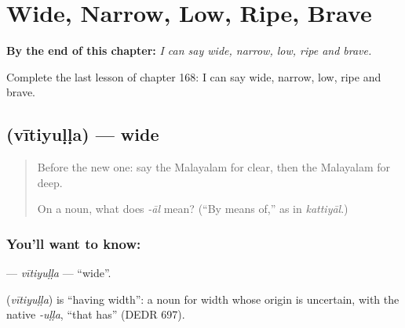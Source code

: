 
\chapter{Wide, Narrow, Low, Ripe, Brave}
\label{ch:ml-wide-narrow-low-ripe-brave}

\begin{chapteropening}
\textbf{By the end of this chapter:} \emph{I can say wide, narrow, low, ripe and brave.}

Complete the last lesson of chapter 168: I can say wide, narrow, low, ripe and brave.
\end{chapteropening}

\section[\texorpdfstring{\ml{വീതിയുള്ള} (vītiyuḷḷa)}{വീതിയുള്ള (vītiyuḷḷa)}]{ (vītiyuḷḷa) — wide}

\label{lesson:ML-C168-vitiyulla}



\begin{quote}
Before the new one: say the Malayalam for clear, then the Malayalam for deep.

On a noun, what does \emph{-āl} mean? (\textquotedblleft{}By means of,\textquotedblright{} as in \emph{kattiyāl}.)
\end{quote}

\subsection*{You'll want to know: }
\textbf{} — \emph{vītiyuḷḷa} — \textquotedblleft{}wide\textquotedblright{}.

\begin{cousinweb}
\textbf{} (\emph{vītiyuḷḷa}) is \textquotedblleft{}having width\textquotedblright{}: a noun for width whose origin is uncertain, with the native \emph{-uḷḷa}, \textquotedblleft{}that has\textquotedblright{} (DEDR 697).
\end{cousinweb}

